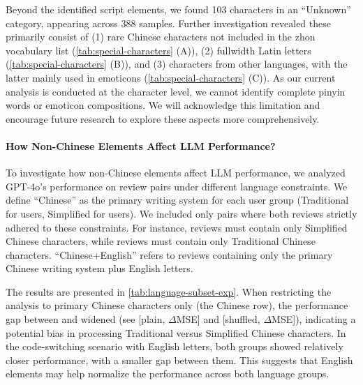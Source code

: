 Beyond the identified script elements, we found 103 characters in an ``Unknown'' category, appearing across 388 samples. Further investigation revealed these primarily consist of (1) rare Chinese characters not included in the zhon~\cite{githubzhon} vocabulary list (\ref{tab:special-characters} (A)), (2) fullwidth Latin letters (\ref{tab:special-characters} (B)), and (3) characters from other languages, with the latter mainly used in emoticons (\ref{tab:special-characters} (C)). As our current analysis is conducted at the character level, we cannot identify complete pinyin words or emoticon compositions. We will acknowledge this limitation and encourage future research to explore these aspects more comprehensively.


\paragraph{How Non-Chinese Elements Affect LLM Performance?}
To investigate how non-Chinese elements affect LLM performance,
we analyzed GPT-4o's performance on review pairs under different language constraints.
We define ``Chinese'' as the primary writing system for each user group
(Traditional for \twChinese users, Simplified for \cnChinese users).
We included only pairs where both reviews strictly adhered to these constraints.
For instance, \cnChinese reviews must contain only Simplified Chinese characters,
while \twChinese reviews must contain only Traditional Chinese characters.
``Chinese+English'' refers to reviews containing only the primary Chinese writing system plus English letters.

The results are presented in \ref{tab:language-subset-exp}.
When restricting the analysis to primary Chinese characters only (the Chinese row),
the performance gap between \twChinese and \cnChinese widened (see [plain, $\Delta$MSE] and [shuffled, $\Delta$MSE]),
indicating a potential bias in processing Traditional versus Simplified Chinese characters.
In the code-switching scenario with English letters, both groups showed relatively closer performance, with a smaller gap between them. This suggests that English elements may help normalize the performance across both language groups.


